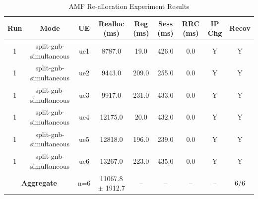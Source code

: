 \begin{table}[ht]
\centering
\begin{tabular}{|c|c|c|c|c|c|c|c|c|}
\hline
Run & Mode & UE & Realloc (ms) & Reg (ms) & Sess (ms) & RRC (ms) & IP Chg & Recov \\
\hline
1 & split-gnb-simultaneous & ue1 & 8787.0 & 19.0 & 426.0 & 0.0 & Y & Y \\
1 & split-gnb-simultaneous & ue2 & 9443.0 & 209.0 & 255.0 & 0.0 & Y & Y \\
1 & split-gnb-simultaneous & ue3 & 9917.0 & 231.0 & 433.0 & 0.0 & Y & Y \\
1 & split-gnb-simultaneous & ue4 & 12175.0 & 20.0 & 432.0 & 0.0 & Y & Y \\
1 & split-gnb-simultaneous & ue5 & 12818.0 & 196.0 & 239.0 & 0.0 & Y & Y \\
1 & split-gnb-simultaneous & ue6 & 13267.0 & 223.0 & 435.0 & 0.0 & Y & Y \\
\multicolumn{2}{|c|}{\textbf{Aggregate}} & n=6 & 11067.8 $\pm$ 1912.7 & -- & -- & -- & -- & 6/6 \\
\hline
\end{tabular}
\caption{AMF Re-allocation Experiment Results}
\label{tab:amf_realloc}
\end{table}

